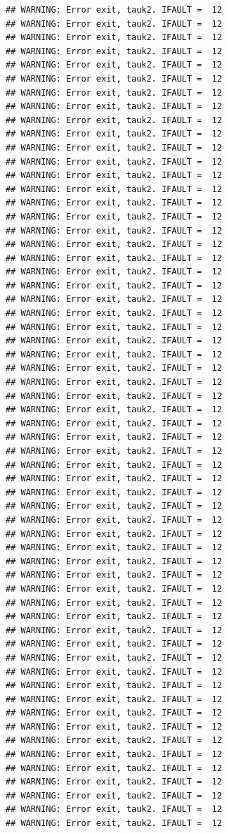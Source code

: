 \documentclass[
  12pt,
]{article}
\begin{document}
\begin{verbatim}
## WARNING: Error exit, tauk2. IFAULT =  12
## WARNING: Error exit, tauk2. IFAULT =  12
## WARNING: Error exit, tauk2. IFAULT =  12
## WARNING: Error exit, tauk2. IFAULT =  12
## WARNING: Error exit, tauk2. IFAULT =  12
## WARNING: Error exit, tauk2. IFAULT =  12
## WARNING: Error exit, tauk2. IFAULT =  12
## WARNING: Error exit, tauk2. IFAULT =  12
## WARNING: Error exit, tauk2. IFAULT =  12
## WARNING: Error exit, tauk2. IFAULT =  12
## WARNING: Error exit, tauk2. IFAULT =  12
## WARNING: Error exit, tauk2. IFAULT =  12
## WARNING: Error exit, tauk2. IFAULT =  12
## WARNING: Error exit, tauk2. IFAULT =  12
## WARNING: Error exit, tauk2. IFAULT =  12
## WARNING: Error exit, tauk2. IFAULT =  12
## WARNING: Error exit, tauk2. IFAULT =  12
## WARNING: Error exit, tauk2. IFAULT =  12
## WARNING: Error exit, tauk2. IFAULT =  12
## WARNING: Error exit, tauk2. IFAULT =  12
## WARNING: Error exit, tauk2. IFAULT =  12
## WARNING: Error exit, tauk2. IFAULT =  12
## WARNING: Error exit, tauk2. IFAULT =  12
## WARNING: Error exit, tauk2. IFAULT =  12
## WARNING: Error exit, tauk2. IFAULT =  12
## WARNING: Error exit, tauk2. IFAULT =  12
## WARNING: Error exit, tauk2. IFAULT =  12
## WARNING: Error exit, tauk2. IFAULT =  12
## WARNING: Error exit, tauk2. IFAULT =  12
## WARNING: Error exit, tauk2. IFAULT =  12
## WARNING: Error exit, tauk2. IFAULT =  12
## WARNING: Error exit, tauk2. IFAULT =  12
## WARNING: Error exit, tauk2. IFAULT =  12
## WARNING: Error exit, tauk2. IFAULT =  12
## WARNING: Error exit, tauk2. IFAULT =  12
## WARNING: Error exit, tauk2. IFAULT =  12
## WARNING: Error exit, tauk2. IFAULT =  12
## WARNING: Error exit, tauk2. IFAULT =  12
## WARNING: Error exit, tauk2. IFAULT =  12
## WARNING: Error exit, tauk2. IFAULT =  12
## WARNING: Error exit, tauk2. IFAULT =  12
## WARNING: Error exit, tauk2. IFAULT =  12
## WARNING: Error exit, tauk2. IFAULT =  12
## WARNING: Error exit, tauk2. IFAULT =  12
## WARNING: Error exit, tauk2. IFAULT =  12
## WARNING: Error exit, tauk2. IFAULT =  12
## WARNING: Error exit, tauk2. IFAULT =  12
## WARNING: Error exit, tauk2. IFAULT =  12
## WARNING: Error exit, tauk2. IFAULT =  12
## WARNING: Error exit, tauk2. IFAULT =  12
## WARNING: Error exit, tauk2. IFAULT =  12
## WARNING: Error exit, tauk2. IFAULT =  12
## WARNING: Error exit, tauk2. IFAULT =  12
## WARNING: Error exit, tauk2. IFAULT =  12
## WARNING: Error exit, tauk2. IFAULT =  12
## WARNING: Error exit, tauk2. IFAULT =  12
## WARNING: Error exit, tauk2. IFAULT =  12
## WARNING: Error exit, tauk2. IFAULT =  12
## WARNING: Error exit, tauk2. IFAULT =  12
## WARNING: Error exit, tauk2. IFAULT =  12

\end{verbatim}
\end{document}
